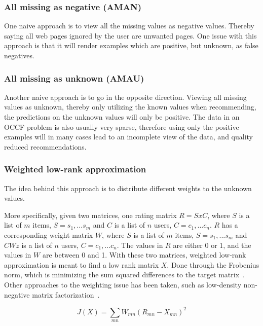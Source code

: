 \subsubsection{All missing as negative (AMAN)}
    One naive approach is to view all the missing values as negative values.
    Thereby saying all web pages ignored by the user are unwanted pages.  One issue
    with this approach is that it will render examples which are positive, but
    unknown, as false negatives.

\subsubsection{All missing as unknown (AMAU)}
    Another naive approach is to go in the opposite direction.  Viewing all missing
    values as unknown, thereby only utilizing the known values when recommending,
    the predictions on the unknown values will only be positive.  The data in an
    OCCF problem is also usually very sparse, therefore using only the positive
    examples will in many cases lead to an incomplete view of the data, and quality
    reduced recommendations.

\subsubsection{Weighted low-rank approximation}
    \cite{pan2008} \cite{Nati03weightedlow-rank}
    The idea behind this approach is to distribute different weights to the unknown
    values.

    More specifically, given two matrices, one rating matrix $R = SxC$, where $S$
    is a list of $m$ items, $S = {s_{1},...s_{m}}$ and $C$ is a list of $n$ users,
    $C = {c_{1}, ... c_{n}}$.
    $R$ has a corresponding weight matrix $W$, where $S$ is a list of $m$ items, $S
    = {s_{1},...s_{m}}$ and $CWz$ is a list of $n$ users, $C = {c_{1}, ... c_{n}}$.
    The values in $R$ are either 0 or 1, and the values in $W$ are between 0 and 1.
    With these two matrices, weighted low-rank approximation is meant to find a low
    rank matrix $X$.  Done through the Frobenius norm, which is minimizing the sum
    squared differences to the target matrix~\cite{frobeniusNorm}.  Other
    approaches to the weighting issue has been taken, such as low-density
    non-negative matrix factorization~\cite{Sindhwani:2010:OMC:1933307.1934641}.

    \begin{equation}
        J(X) = \sum_{mn} W_{mn}(R_{mn} - X_{mn})^2
        \label{equation:frobenius}
    \end{equation}

